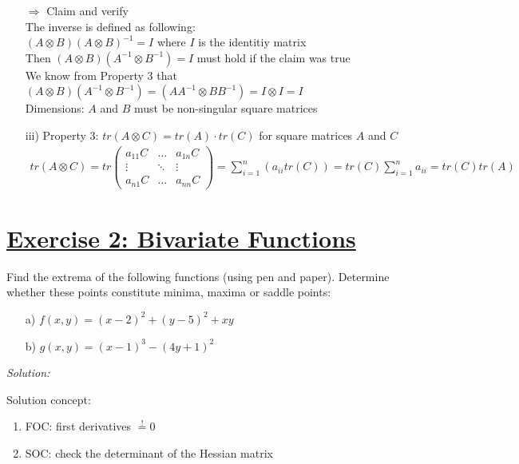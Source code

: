 \documentclass[12pt,a4paper]{article}
\newcommand{\tmpsection}[1]{}
\let\tmpsection=\section
\renewcommand{\section}[1]{\tmpsection{\underline{#1}} }
\begin{document}
\begin{itemize}
    $\Rightarrow$ Claim and verify \\
    The inverse is defined as following: \\
    $(A \otimes B)(A \otimes B)^{-1} = I$ where $I$ is the identitiy matrix\\
    Then $(A \otimes B)(A^{-1} \otimes B^{-1}) = I$ must hold if the claim was true\\
    We know from Property 3 that $(A \otimes B)(A^{-1} \otimes B^{-1}) = (AA^{-1} \otimes BB^{-1}) =  I \otimes I = I$ \\
    Dimensions: $A$ and $B$ must be non-singular square matrices
    \item[iii)] Property 3: $tr(A \otimes C ) = tr(A) \cdot tr( C)$ for square matrices $A$ and $C$
    \begin{align*}
      tr(A \otimes C) = 
      tr 
      \begin{pmatrix}
        a_{11}C & \ldots & a_{1n}C \\
        \vdots & \ddots & \vdots \\
        a_{n1}C & \ldots & a_{nn}C
      \end{pmatrix}
      = \sum_{i = 1}^{n}\left( a_{ii} tr(C) \right) = tr(C) \sum_{i=1}^{n} a_{ii} = tr(C) tr(A)
    \end{align*}
\end{itemize}

\hypertarget{exercise-2-bivariate-functions}{%
\section{Exercise 2: Bivariate
Functions}\label{exercise-2-bivariate-functions}}

Find the extrema of the following functions (using pen and paper).
Determine whether these points constitute minima, maxima or saddle
points:

\begin{itemize}
    \item[a)] $f(x,y) = (x -2)^2 + (y -5)^2 + xy$
    \item[b)] $g(x,y) = (x -1)^3 - (4y + 1)^2$
\end{itemize}

\emph{Solution:}

Solution concept:

\begin{enumerate}
    \item FOC: first derivatives $\overset{!}{=} 0$
    \item SOC: check the determinant of the Hessian matrix
\end{enumerate}
\end{document}
